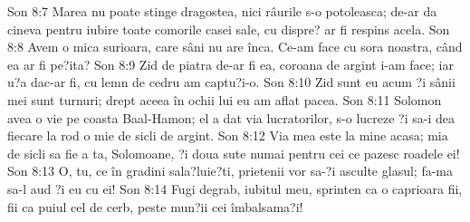 Son 8:7  Marea nu poate stinge dragostea, nici râurile s-o potoleasca; de-ar da cineva pentru iubire toate comorile casei sale, cu dispre? ar fi respins acela.
Son 8:8  Avem o mica surioara, care sâni nu are înca. Ce-am face cu sora noastra, când ea ar fi pe?ita?
Son 8:9  Zid de piatra de-ar fi ea, coroana de argint i-am face; iar u?a dac-ar fi, cu lemn de cedru am captu?i-o.
Son 8:10  Zid sunt eu acum ?i sânii mei sunt turnuri; drept aceea în ochii lui eu am aflat pacea.
Son 8:11  Solomon avea o vie pe coasta Baal-Hamon; el a dat via lucratorilor, s-o lucreze ?i sa-i dea fiecare la rod o mie de sicli de argint.
Son 8:12  Via mea este la mine acasa; mia de sicli sa fie a ta, Solomoane, ?i doua sute numai pentru cei ce pazesc roadele ei!
Son 8:13  O, tu, ce în gradini sala?luie?ti, prietenii vor sa-?i asculte glasul; fa-ma sa-l aud ?i eu cu ei!
Son 8:14  Fugi degrab, iubitul meu, sprinten ca o caprioara fii, fii ca puiul cel de cerb, peste mun?ii cei îmbalsama?i!


